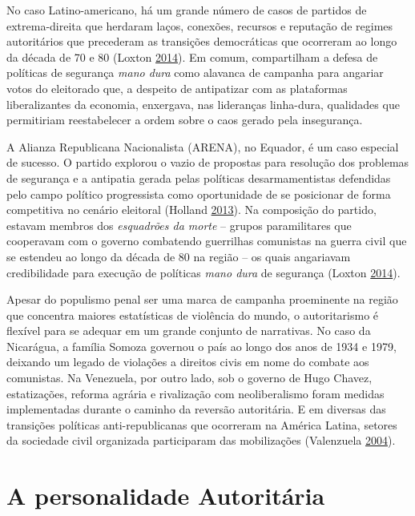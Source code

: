 \documentclass[12 pt,]{article}
\begin{document}
No caso Latino-americano, há um grande número de casos de partidos de
extrema-direita que herdaram laços, conexões, recursos e reputação de
regimes autoritários que precederam as transições democráticas que
ocorreram ao longo da década de 70 e 80 (Loxton
\protect\hyperlink{ref-loxton2014authoritarian}{2014}). Em comum,
compartilham a defesa de políticas de segurança \emph{mano dura} como
alavanca de campanha para angariar votos do eleitorado que, a despeito
de antipatizar com as plataformas liberalizantes da economia, enxergava,
nas lideranças linha-dura, qualidades que permitiriam reestabelecer a
ordem sobre o caos gerado pela insegurança.

A Alianza Republicana Nacionalista (ARENA), no Equador, é um caso
especial de sucesso. O partido explorou o vazio de propostas para
resolução dos problemas de segurança e a antipatia gerada pelas
políticas desarmamentistas defendidas pelo campo político progressista
como oportunidade de se posicionar de forma competitiva no cenário
eleitoral (Holland \protect\hyperlink{ref-holland2013right}{2013}). Na
composição do partido, estavam membros dos \emph{esquadrões da morte} --
grupos paramilitares que cooperavam com o governo combatendo guerrilhas
comunistas na guerra civil que se estendeu ao longo da década de 80 na
região -- os quais angariavam credibilidade para execução de políticas
\emph{mano dura} de segurança (Loxton
\protect\hyperlink{ref-loxton2014authoritarian}{2014}).

Apesar do populismo penal ser uma marca de campanha proeminente na
região que concentra maiores estatísticas de violência do mundo, o
autoritarismo é flexível para se adequar em um grande conjunto de
narrativas. No caso da Nicarágua, a família Somoza governou o país ao
longo dos anos de 1934 e 1979, deixando um legado de violações a
direitos civis em nome do combate aos comunistas. Na Venezuela, por
outro lado, sob o governo de Hugo Chavez, estatizações, reforma agrária
e rivalização com neoliberalismo foram medidas implementadas durante o
caminho da reversão autoritária. E em diversas das transições políticas
anti-republicanas que ocorreram na América Latina, setores da sociedade
civil organizada participaram das mobilizações (Valenzuela
\protect\hyperlink{ref-valenzuela2004latin}{2004}).

\hypertarget{a-personalidade-autoritaria}{%
\section{A personalidade
Autoritária}\label{a-personalidade-autoritaria}}
\end{document}
